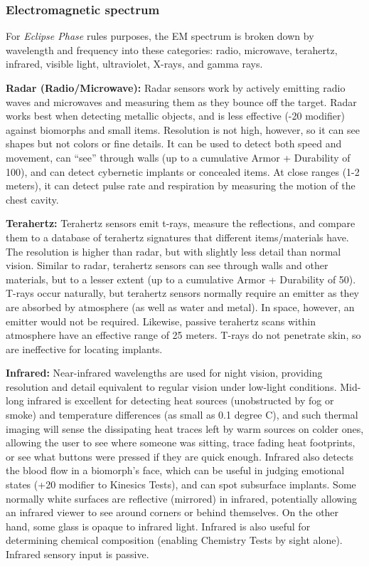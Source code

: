 \subsubsection{Electromagnetic spectrum} 

For \textit{Eclipse Phase} rules purposes, the EM spectrum is broken down by wavelength and frequency into these categories: radio, microwave, terahertz, infrared, visible light, ultraviolet, X-rays, and gamma rays. 

\textbf{Radar (Radio/Microwave): }Radar sensors work by actively emitting radio waves and microwaves and measuring them as they bounce off the target. Radar works best when detecting metallic objects, and is less effective (-20 modifier) against biomorphs and small items. Resolution is not high, however, so it can see shapes but not colors or fine details. It can be used to detect both speed and movement, can ``see'' through walls (up to a cumulative Armor + Durability of 100), and can detect cybernetic implants or concealed items. At close ranges (1-2 meters), it can detect pulse rate and respiration by measuring the motion of the chest cavity. 

\textbf{Terahertz:} Terahertz sensors emit t-rays, measure the reflections, and compare them to a database of terahertz signatures that different items/materials have. The resolution is higher than radar, but with slightly less detail than normal vision. Similar to radar, terahertz sensors can see through walls and other materials, but to a lesser extent (up to a cumulative Armor + Durability of 50). T-rays occur naturally, but terahertz sensors normally require an emitter as they are absorbed by atmosphere (as well as water and metal). In space, however, an emitter would not be required. Likewise, passive terahertz scans within atmosphere have an effective range of 25 meters. T-rays do not penetrate skin, so are ineffective for locating implants. 

\textbf{Infrared:} Near-infrared wavelengths are used for night vision, providing resolution and detail equivalent to regular vision under low-light conditions. Mid-long infrared is excellent for detecting heat sources (unobstructed by fog or smoke) and temperature differences (as small as 0.1 degree C), and such thermal imaging will sense the dissipating heat traces left by warm sources on colder ones, allowing the user to see where someone was sitting, trace fading heat footprints, or see what buttons were pressed if they are quick enough. Infrared also detects the blood flow in a biomorph’s face, which can be useful in judging emotional states (+20 modifier to Kinesics Tests), and can spot subsurface implants. Some normally white surfaces are reflective (mirrored) in infrared, potentially allowing an infrared viewer to see around corners or behind themselves. On the other hand, some glass is opaque to infrared light. Infrared is also useful for determining chemical composition (enabling Chemistry Tests by sight alone). Infrared sensory input is passive. 

